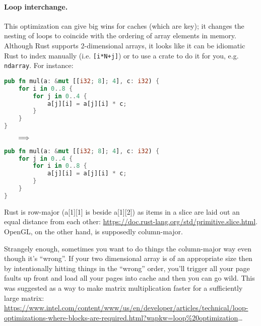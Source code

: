 \paragraph{Loop interchange.} This optimization can give big wins
for caches (which are key); it changes the nesting of loops to
coincide with the ordering of array elements in memory. Although Rust
supports 2-dimensional arrays, it looks like it can be idiomatic Rust to index
manually (i.e. \texttt{[i*N+j]}) or to use a crate to do it for you, e.g.
\texttt{ndarray}.
For instance:
\begin{center}
\vspace*{-1em}
\begin{minipage}{.39\textwidth}
  \begin{lstlisting}[language=Rust]
pub fn mul(a: &mut [[i32; 8]; 4], c: i32) {
    for i in 0..8 {
        for j in 0..4 {
            a[j][i] = a[j][i] * c;
        }
    }
}
  \end{lstlisting}
  \end{minipage} $\hspace*{2em} \Longrightarrow \hspace*{2em}$ \begin{minipage}{.4\textwidth}
  \begin{lstlisting}[language=Rust]
pub fn mul(a: &mut [[i32; 8]; 4], c: i32) {
    for j in 0..4 {
        for i in 0..8 {
            a[j][i] = a[j][i] * c;
        }
    }
}
  \end{lstlisting}
  \end{minipage}
  \end{center}
  Rust is row-major (a[1][1] is beside a[1][2]) as items in a slice are laid out an equal distance from each other: {\scriptsize \url{https://doc.rust-lang.org/std/primitive.slice.html}}. OpenGL, on the other hand, is supposedly column-major.

Strangely enough, sometimes you want to do things the column-major way even though it's ``wrong''. If your two dimensional array is of an appropriate size then by intentionally hitting things in the ``wrong'' order, you'll trigger all your page faults up front and load all your pages into cache and then you can go wild. This was suggested as a way to make matrix multiplication faster for a sufficiently large matrix: {\scriptsize \url{https://www.intel.com/content/www/us/en/developer/articles/technical/loop-optimizations-where-blocks-are-required.html?wapkw=loop%20optimization}}\ldots

\newpage
